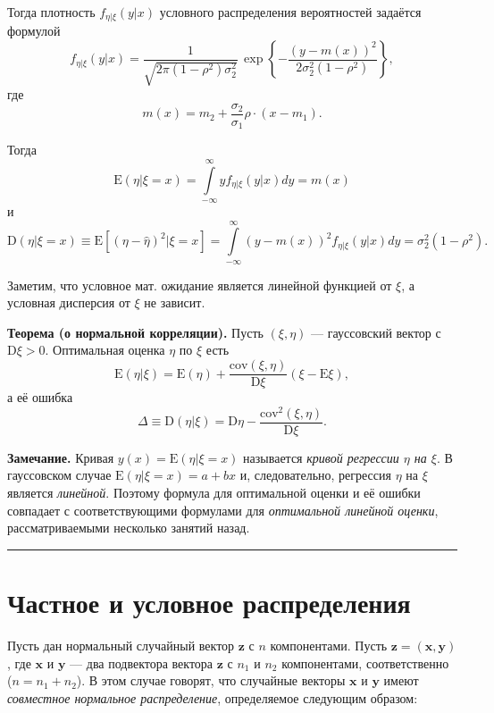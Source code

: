 \documentclass[11pt,a4paper]{article}
\begin{document}
Тогда плотность \(f_{\eta|\xi}(y|x)\) условного распределения
вероятностей задаётся формулой \[
  f_{\eta|\xi}(y|x) = \frac{1}{\sqrt{2\pi(1-\rho^2)\sigma_2^2}} \, \exp\left\{-\frac{(y-m(x))^2}{2\sigma_2^2 (1-\rho^2)} \right\},
\] где \[
  m(x) = m_2 + \frac{\sigma_2}{\sigma_1}\rho \cdot (x-m_1).
\]

    Тогда \[
   \mathrm{E}(\eta|\xi=x) = \int\limits_{-\infty}^{\infty} y f_{\eta|\xi}(y|x) dy = m(x)
\] и \[
   \mathrm{D}(\eta|\xi=x) \equiv \mathrm{E} \left[ (\eta-\hat{\eta})^2|\xi=x \right]
   = \int\limits_{-\infty}^{\infty} (y-m(x))^2 f_{\eta|\xi}(y|x) dy = \sigma_2^2 (1-\rho^2).
\]

Заметим, что условное мат. ожидание является линейной функцией от
\(\xi\), а условная дисперсия от \(\xi\) не зависит.

    \textbf{Теорема (о нормальной корреляции).} Пусть \((\xi, \eta)\) ---
гауссовский вектор с \(\mathrm{D}\xi > 0\). Оптимальная оценка \(\eta\)
по \(\xi\) есть \[
    \mathrm{E}(\eta|\xi) = \mathrm{E}(\eta) + \frac{\mathrm{cov}(\xi, \eta)}{\mathrm{D}\xi}(\xi - \mathrm{E}\xi),
\] а её ошибка \[
    \Delta \equiv \mathrm{D}(\eta|\xi) = \mathrm{D}\eta - \frac{\mathrm{cov}^2(\xi, \eta)}{\mathrm{D}\xi}.
\]

\textbf{Замечание.} Кривая \(y(x) = \mathrm{E}(\eta|\xi=x)\) называется
\emph{кривой регрессии \(\eta\) на \(\xi\)}. В гауссовском случае
\(\mathrm{E}(\eta|\xi=x) = a+bx\) и, следовательно, регрессия \(\eta\)
на \(\xi\) является \emph{линейной}. Поэтому формула для оптимальной
оценки и её ошибки совпадает с соответствующими формулами для
\emph{оптимальной линейной оценки}, рассматриваемыми несколько занятий
назад.

    \begin{center}\rule{0.5\linewidth}{0.5pt}\end{center}

    \hypertarget{ux447ux430ux441ux442ux43dux44bux435-ux438-ux443ux441ux43bux43eux432ux43dux44bux435-ux440ux430ux441ux43fux440ux435ux434ux435ux43bux435ux43dux438ux44f}{%
\section{Частное и условное
распределения}\label{ux447ux430ux441ux442ux43dux44bux435-ux438-ux443ux441ux43bux43eux432ux43dux44bux435-ux440ux430ux441ux43fux440ux435ux434ux435ux43bux435ux43dux438ux44f}}

    Пусть дан нормальный случайный вектор \(\mathbf{z}\) с \(n\)
компонентами. Пусть \(\mathbf{z} = (\mathbf{x}, \mathbf{y})\), где
\(\mathbf{x}\) и \(\mathbf{y}\) --- два подвектора вектора
\(\mathbf{z}\) с \(n_1\) и \(n_2\) компонентами, соответственно
(\(n = n_1 + n_2\)). В этом случае говорят, что случайные векторы
\(\mathbf{x}\) и \(\mathbf{y}\) имеют \emph{совместное нормальное
распределение}, определяемое следующим образом:
\end{document}
